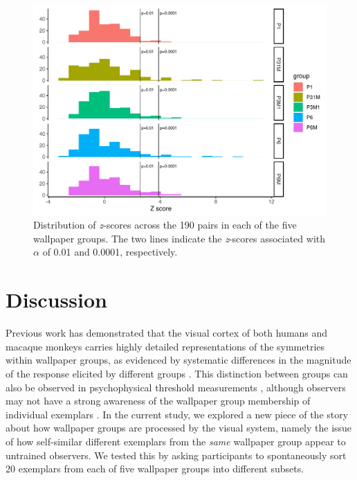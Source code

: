 \documentclass[symmetry,article,accept,pdftex,moreauthors]{Definitions/mdpi}
\begin{document}
\begin{figure}[H]
	
	\includegraphics[width=.85\linewidth]{./figures/emp-jaccard-histogram-w-annotations-no-hyphen.pdf}
	\caption{Distribution of \textit{z}-scores across the 190 pairs in each of the five wallpaper groups. The two lines indicate the \textit{z}-scores associated with $\alpha$ of 0.01 and 0.0001, respectively.}%
	\label{fig:jaccard_permutation}
\end{figure}
\section{Discussion}
Previous work has demonstrated that the visual cortex of both humans and macaque monkeys carries highly detailed representations of the symmetries within wallpaper groups, as evidenced by systematic differences in the magnitude of the response elicited by different groups \citep{RN1725,RN1959,kohler_clarke_2021,audurier_symmetry_2021}. This distinction between groups can also be observed in psychophysical threshold measurements \citep{kohler_clarke_2021}, although observers may not have a strong awareness of the wallpaper group membership of individual exemplars \citep{RN172}. In the current study, we explored a new piece of the story about how wallpaper groups are processed by the visual system, namely the issue of how self-similar different exemplars from the \textit{same} wallpaper group appear to untrained observers. We tested this by asking participants to spontaneously sort 20 exemplars from each of five wallpaper groups into different subsets. 
\end{document}
